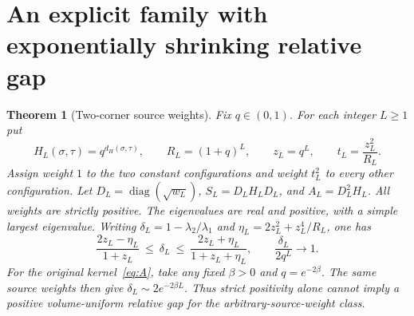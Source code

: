 \documentclass[11pt]{article}
\newtheorem{theorem}{Theorem}[section]
\begin{document}
\section{An explicit family with exponentially shrinking relative gap}
\begin{theorem}[Two-corner source weights]\label{thm:corner}
Fix $q\in(0,1)$. For each integer $L\ge1$ put
\[
 H_L(\sigma,\tau)=q^{d_H(\sigma,\tau)},\qquad
 R_L=(1+q)^L,\qquad z_L=q^L,\qquad t_L=\frac{z_L^2}{R_L}.
\]
Assign weight $1$ to the two constant configurations and weight $t_L^2$ to every
other configuration. Let $D_L=\operatorname{diag}(\sqrt{w_L})$,
$S_L=D_LH_LD_L$, and $A_L=D_L^2H_L$. All weights are strictly positive.
The eigenvalues are real and positive, with a simple largest eigenvalue.
Writing $\delta_L=1-\lambda_2/\lambda_1$ and
$\eta_L=2z_L^2+z_L^4/R_L$, one has
\begin{equation}\label{eq:delta}
 \frac{2z_L-\eta_L}{1+z_L}\ \le\ \delta_L\ \le\
 \frac{2z_L+\eta_L}{1+z_L+\eta_L},\qquad
 \frac{\delta_L}{2q^L}\longrightarrow1.
\end{equation}
For the original kernel~\eqref{eq:A}, take any fixed $\beta>0$ and
$q=e^{-2\beta}$. The same source weights then give
$\delta_L\sim2e^{-2\beta L}$. Thus strict positivity alone cannot imply a
positive volume-uniform relative gap for the arbitrary-source-weight class.
\end{theorem}
\end{document}
